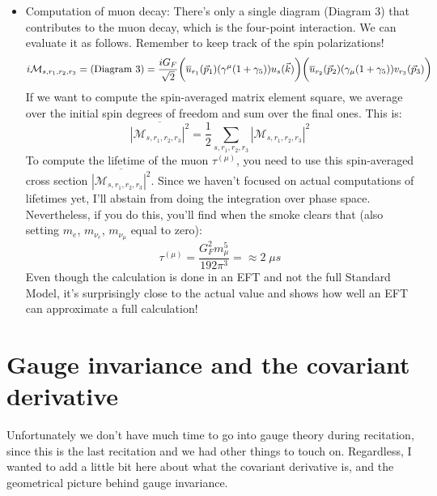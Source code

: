 \documentclass[12pt, oneside]{article}   	%
\theoremstyle{definition}
\begin{document}
\begin{itemize}
	\item Computation of muon decay: There's only a single diagram (Diagram 3) that contributes to the muon decay, which is the four-point interaction. We can evaluate it as follows. Remember to keep track of the spin polarizations!
	\begin{equation}
		i\mathcal M_{s, r_1, r_2, r_3} = (\textnormal{Diagram 3}) = \frac{i G_F}{\sqrt 2} \bigg(\overline u_{r_1}(\vec p_1) (\gamma^\mu (1 + \gamma_5)) u_s(\vec k) \bigg) \bigg(\overline u_{r_2}(\vec p_2) (\gamma_\mu (1 + \gamma_5)) v_{r_3}(\vec p_3) \bigg)
	\end{equation}
	If we want to compute the spin-averaged matrix element square, we average over the initial spin degrees of freedom and sum over the final ones. This is:
	 \begin{equation}
	 	\overline{| \mathcal M_{s, r_1, r_2, r_3} |^2} = \frac{1}{2} \sum_{s, r_1, r_2, r_3} |\mathcal M_{s, r_1, r_2, r_3}|^2
	 \end{equation}
	 To compute the lifetime of the muon $\tau^{(\mu)}$, you need to use this spin-averaged cross section $\overline{|\mathcal M_{s, r_1, r_2, r_3}|^2}$. Since we haven't focused on actual computations of lifetimes yet, I'll abstain from doing the integration over phase space. Nevertheless, if you do this, you'll find when the smoke clears that (also setting $m_e$, $m_{\nu_e}$, $m_{\nu_\mu}$ equal to zero):
	 \begin{equation}
	 	\tau^{(\mu)} = \frac{G_F^2 m_\mu^5}{192\pi^3} = \approx 2\;\mu s
	 \end{equation}
	 Even though the calculation is done in an EFT and not the full Standard Model, it's surprisingly close to the actual value and shows how well an EFT can approximate a full calculation!
	
\end{itemize}

\section*{Gauge invariance and the covariant derivative}

Unfortunately we don't have much time to go into gauge theory during recitation, since this is the last recitation and we had other things to touch on. Regardless, I wanted to add a little bit here about what the covariant derivative is, and the geometrical picture behind gauge invariance. 
\end{document}
